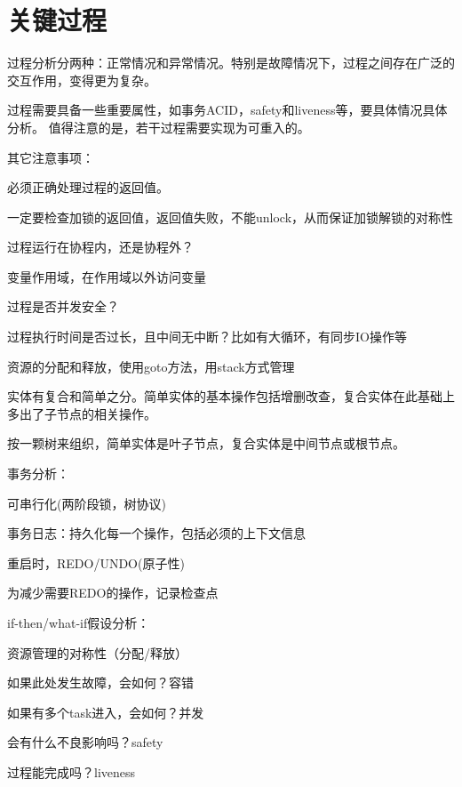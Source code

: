 \chapter{关键过程}

过程分析分两种：正常情况和异常情况。特别是故障情况下，过程之间存在广泛的交互作用，变得更为复杂。

过程需要具备一些重要属性，如事务ACID，safety和liveness等，要具体情况具体分析。
值得注意的是，若干过程需要实现为可重入的。

其它注意事项：
\begin{compactenum}
\item 必须正确处理过程的返回值。
\item 一定要检查加锁的返回值，返回值失败，不能unlock，从而保证加锁解锁的对称性
\item 过程运行在协程内，还是协程外？
\item 变量作用域，在作用域以外访问变量
\item 过程是否并发安全？
\item 过程执行时间是否过长，且中间无中断？比如有大循环，有同步IO操作等
\item 资源的分配和释放，使用goto方法，用stack方式管理
\end{compactenum}

实体有复合和简单之分。简单实体的基本操作包括增删改查，复合实体在此基础上多出了子节点的相关操作。

按一颗树来组织，简单实体是叶子节点，复合实体是中间节点或根节点。

事务分析：
\begin{compactenum}
\item 可串行化(两阶段锁，树协议)
\item 事务日志：持久化每一个操作，包括必须的上下文信息
\item 重启时，REDO/UNDO(原子性)
\item 为减少需要REDO的操作，记录检查点
\end{compactenum}

if-then/what-if假设分析：
\begin{compactenum}
\item 资源管理的对称性（分配/释放）
\item 如果此处发生故障，会如何？容错
\item 如果有多个task进入，会如何？并发
\item 会有什么不良影响吗？safety
\item 过程能完成吗？liveness
\end{compactenum}

